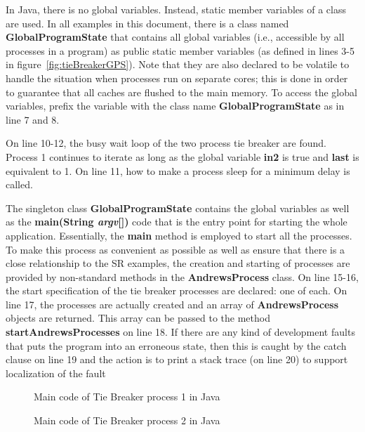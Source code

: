 \documentclass[11pt]{article} %
\begin{document}
In Java, there is no global variables. Instead, static member variables of a class are used. In all examples in this document, there is a class named {\bfseries GlobalProgramState} that contains all global variables (i.e., accessible by all processes in a program) as public static member variables (as defined in lines 3-5 in figure~\ref{fig:tieBreakerGPS}). Note that they are also declared to be volatile to handle the situation when processes run on separate cores; this is done in order to guarantee that all caches are flushed to the main memory. To access the global variables, prefix the variable with the class name {\bfseries GlobalProgramState} as in line 7 and 8.

On line 10-12, the busy wait loop of the two process tie breaker are found. Process 1 continues to iterate as long as the global variable {\bfseries in2} is true and {\bfseries last} is equivalent to 1. On line 11, how to make a process sleep for a minimum delay is called. 

The singleton class {\bfseries GlobalProgramState} contains the global variables as well as the {\bfseries main(String \emph{argv}[])} code that is the entry point for starting the whole application. Essentially, the {\bfseries main} method is employed to start all the processes. To make this process as convenient as possible as well as ensure that there is a close relationship to the SR examples, the creation and starting of processes are provided by non-standard methods in the {\bfseries AndrewsProcess} class. On line 15-16, the start specification of the tie breaker processes are declared: one of each. On line 17, the processes are actually created and an array of {\bfseries AndrewsProcess} objects are returned. This array can be passed to the method {\bfseries startAndrewsProcesses} on line 18. If there are any kind of development faults that puts the program into an erroneous state, then this is caught by the catch clause on line 19 and the action is to print  a stack trace (on line 20) to support localization of the fault



\lstset{inputpath=c:/git/IT325G/IT325G/examples/se/his/iit/it325g/examples/busyWaiting/twoProcessTieBreaker}
\begin{figure}

\caption{Main code of Tie Breaker process 1 in Java}
\label{fig:tieBreakerProcess1}
\end{figure}

\begin{figure}

\caption{Main code of Tie Breaker process 2 in Java}
\label{fig:tieBreakerProcess2}
\end{figure}
\end{document}

